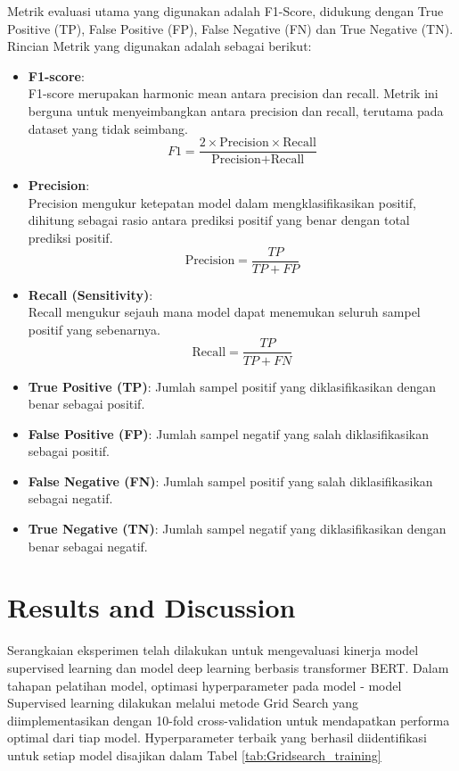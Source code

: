 \documentclass{article}\usepackage{float}
\begin{document}
Metrik evaluasi utama yang digunakan adalah F1-Score, didukung dengan True Positive (TP), False Positive (FP), False Negative (FN) dan True Negative (TN). Rincian Metrik yang digunakan adalah sebagai berikut:
\begin{itemize}
    \item \textbf{F1-score}: \\
    F1-score merupakan harmonic mean antara precision dan recall. Metrik ini berguna untuk menyeimbangkan antara precision dan recall, terutama pada dataset yang tidak seimbang.
    \[
    F1 = \frac{2 \times \text{Precision} \times \text{Recall}}{\text{Precision} + \text{Recall}}
    \]
    
    \item \textbf{Precision}: \\
    Precision mengukur ketepatan model dalam mengklasifikasikan positif, dihitung sebagai rasio antara prediksi positif yang benar dengan total prediksi positif.
    \[
    \text{Precision} = \frac{TP}{TP + FP}
    \]
    
    \item \textbf{Recall (Sensitivity)}: \\
    Recall mengukur sejauh mana model dapat menemukan seluruh sampel positif yang sebenarnya.
    \[
    \text{Recall} = \frac{TP}{TP + FN}
    \]
    
    \item \textbf{True Positive (TP)}:
    Jumlah sampel positif yang diklasifikasikan dengan benar sebagai positif.
    
    \item \textbf{False Positive (FP)}:
    Jumlah sampel negatif yang salah diklasifikasikan sebagai positif.
    
    \item \textbf{False Negative (FN)}: 
    Jumlah sampel positif yang salah diklasifikasikan sebagai negatif.
    
    \item \textbf{True Negative (TN)}:
    Jumlah sampel negatif yang diklasifikasikan dengan benar sebagai negatif.
\end{itemize}

\section{Results and Discussion}

Serangkaian eksperimen telah dilakukan untuk mengevaluasi kinerja model supervised learning dan model deep learning berbasis transformer BERT. Dalam tahapan pelatihan model, optimasi hyperparameter pada model - model Supervised learning dilakukan melalui metode Grid Search yang diimplementasikan dengan 10-fold cross-validation untuk mendapatkan performa optimal dari tiap model. Hyperparameter terbaik yang berhasil diidentifikasi untuk setiap model disajikan dalam Tabel \ref{tab:Gridsearch_training}
\end{document}
